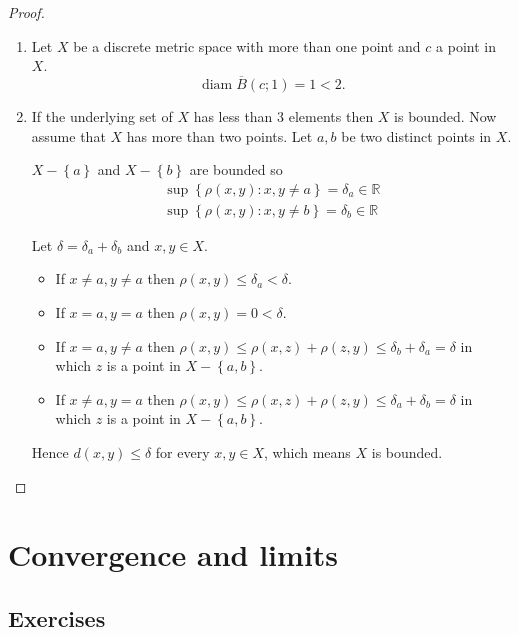 \begin{proof}
	\begin{enumerate}[label={(\alph*)}]
		\item Let \( X \) be a discrete metric space with more than one point and \( c \) a point in \( X \).
		      \[
			      \operatorname{diam}\overline{B}(c; 1) = 1 < 2.
		      \]
		\item If the underlying set of \( X \) has less than \( 3 \) elements then \( X \) is bounded. Now assume that \( X \) has more than two points. Let \( a, b \) be two distinct points in \( X \).

		      \( X - \left\{ a \right\} \) and \( X - \left\{ b \right\} \) are bounded so
		      \[
			      \begin{split}
				      \sup\left\{ \rho(x, y) : x, y \ne a \right\} = \delta_{a} \in \mathbb{R} \\
				      \sup\left\{ \rho(x, y) : x, y \ne b \right\} = \delta_{b} \in \mathbb{R}
			      \end{split}
		      \]

		      Let \( \delta = \delta_{a} + \delta_{b} \) and \( x, y \in X \).
		      \begin{itemize}
			      \item If \( x \ne a, y \ne a \) then \( \rho(x, y) \le \delta_{a} < \delta \).
			      \item If \( x = a, y = a  \) then \( \rho(x, y) = 0 < \delta \).
			      \item If \( x = a, y \ne a \) then \( \rho(x, y) \le \rho(x, z) + \rho(z, y) \le \delta_{b} + \delta_{a} = \delta \) in which \( z \) is a point in \( X - \left\{ a, b \right\} \).
			      \item If \( x \ne a, y = a \) then \( \rho(x, y) \le \rho(x, z) + \rho(z, y) \le \delta_{a} + \delta_{b} = \delta \) in which \( z \) is a point in \( X - \left\{ a, b \right\} \).
		      \end{itemize}

		      Hence \( d(x, y) \le \delta \) for every \( x, y \in X \), which means \( X \) is bounded.
	\end{enumerate}
\end{proof}

\section{Convergence and limits}

\subsection*{Exercises}

